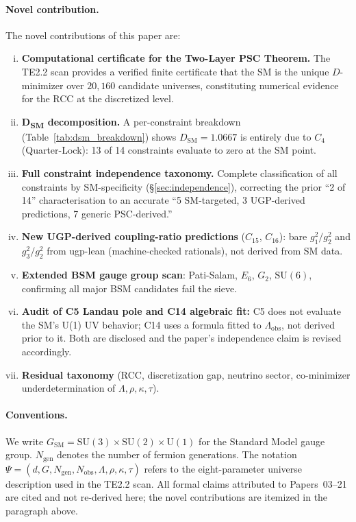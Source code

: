 \documentclass[11pt,twocolumn]{article}
\theoremstyle{remark}
\begin{document}
\paragraph{Novel contribution.}
The novel contributions of this paper are:
\begin{enumerate}[(i)]
\item \textbf{Computational certificate for the Two-Layer PSC Theorem.}
  The TE2.2 scan provides a verified finite certificate that the SM is
  the unique $D$-minimizer over $20{,}160$ candidate universes,
  constituting numerical evidence for the RCC at the discretized level.
\item \textbf{D\textsubscript{SM} decomposition.}
  A per-constraint breakdown (Table~\ref{tab:dsm_breakdown}) shows
  $D_{\mathrm{SM}}=1.0667$ is entirely due to $C_4$ (Quarter-Lock):
  13 of 14 constraints evaluate to zero at the SM point.
\item \textbf{Full constraint independence taxonomy.}
  Complete classification of all constraints by SM-specificity
  (§\ref{sec:independence}), correcting the prior ``2 of 14''
  characterisation to an accurate ``5 SM-targeted, 3 UGP-derived
  predictions, 7 generic PSC-derived.''
\item \textbf{New UGP-derived coupling-ratio predictions} ($C_{15}$,
  $C_{16}$): bare $g_1^2/g_2^2$ and $g_3^2/g_2^2$ from ugp-lean
  (machine-checked rationals), not derived from SM data.
\item \textbf{Extended BSM gauge group scan}: Pati-Salam, $E_6$, $G_2$,
  $\mathrm{SU}(6)$, confirming all major BSM candidates fail the sieve.
\item \textbf{Audit of C5 Landau pole and C14 algebraic fit:}
  C5 does not evaluate the SM's U(1) UV behavior; C14 uses a formula
  fitted to $\Lambda_{\mathrm{obs}}$, not derived prior to it. Both
  are disclosed and the paper's independence claim is revised accordingly.
\item \textbf{Residual taxonomy} (RCC, discretization gap, neutrino sector,
  co-minimizer underdetermination of $\Lambda,\rho,\kappa,\tau$).
\end{enumerate}

\paragraph{Conventions.}
We write $G_{\mathrm{SM}}=\mathrm{SU}(3)\times\mathrm{SU}(2)\times
\mathrm{U}(1)$ for the Standard Model gauge group.
$N_{\mathrm{gen}}$ denotes the number of fermion generations.
The notation $\Psi=(d,G,N_{\mathrm{gen}},N_{\mathrm{obs}},\Lambda,
\rho,\kappa,\tau)$ refers to the eight-parameter universe description
used in the TE2.2 scan.
All formal claims attributed to Papers~03--21 are cited and not
re-derived here; the novel contributions are itemized in the
paragraph above.
\end{document}

